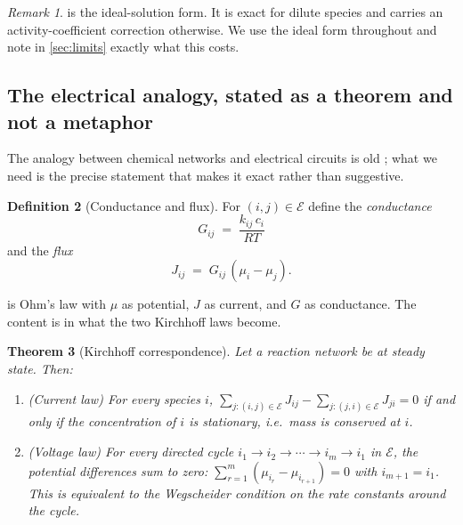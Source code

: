 \documentclass[11pt,twocolumn,a4paper]{article}
\theoremstyle{plain}
\newtheorem{theorem}{Theorem}[section]
\theoremstyle{definition}
\newtheorem{definition}[theorem]{Definition}
\theoremstyle{remark}
\newtheorem{remark}[theorem]{Remark}
\begin{document}
\begin{remark}
 is the ideal-solution form. It is exact for dilute species and
carries an activity-coefficient correction otherwise. We use the ideal form
throughout and note in \cref{sec:limits} exactly what this costs.
\end{remark}

\subsection{The electrical analogy, stated as a theorem and not a metaphor}

The analogy between chemical networks and electrical circuits is old
\citep{Oster1971,Peusner1986}; what we need is the precise statement that makes
it exact rather than suggestive.

\begin{definition}[Conductance and flux]
\label{def:conductance}
For $(i,j) \in \mathcal{E}$ define the \emph{conductance}
\begin{equation}
G_{ij} \;=\; \frac{k_{ij}\,c_i}{RT}
\label{eq:G}
\end{equation}
and the \emph{flux}
\begin{equation}
J_{ij} \;=\; G_{ij}\,(\mu_i - \mu_j).
\label{eq:J}
\end{equation}
\end{definition}

 is Ohm's law with $\mu$ as potential, $J$ as current, and $G$ as
conductance. The content is in what the two Kirchhoff laws become.

\begin{theorem}[Kirchhoff correspondence]
\label{thm:kirchhoff}
Let a reaction network be at steady state. Then:
\begin{enumerate}[label=(\roman*),leftmargin=2.2em]
\item \emph{(Current law)} For every species $i$,
$\sum_{j:(i,j)\in\mathcal{E}} J_{ij} - \sum_{j:(j,i)\in\mathcal{E}} J_{ji} = 0$
if and only if the concentration of $i$ is stationary, i.e.\ mass is conserved
at $i$.
\item \emph{(Voltage law)} For every directed cycle
$i_1 \to i_2 \to \cdots \to i_m \to i_1$ in $\mathcal{E}$, the potential
differences sum to zero:
$\sum_{r=1}^{m}(\mu_{i_r} - \mu_{i_{r+1}}) = 0$ with $i_{m+1}=i_1$.
This is equivalent to the Wegscheider condition on the rate constants around
the cycle.
\end{enumerate}
\end{theorem}
\end{document}
